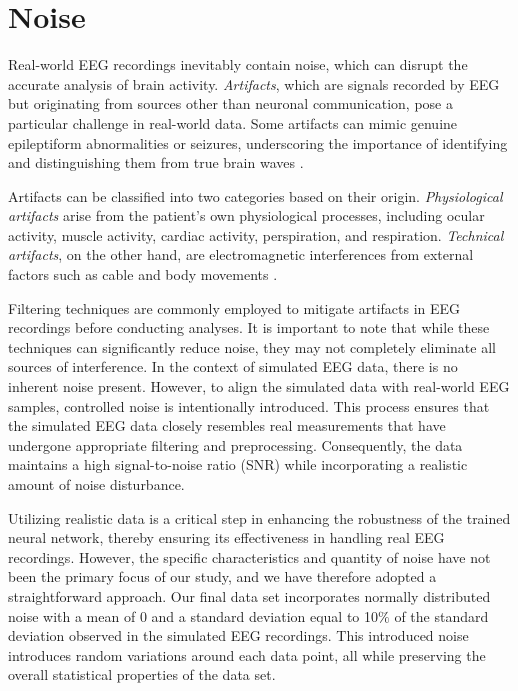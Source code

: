 \documentclass[a4paper, UKenglish, 11pt]{uiomaster}
\begin{document}
\section{Noise} \label{chap:noise}
Real-world EEG recordings inevitably contain noise, which can disrupt the accurate analysis of brain activity. \emph{Artifacts}, which are signals recorded by EEG but originating from sources other than neuronal communication, pose a particular challenge in real-world data. Some artifacts can mimic genuine epileptiform abnormalities or seizures, underscoring the importance of identifying and distinguishing them from true brain waves \cite{sazgar2019eeg}.

Artifacts can be classified into two categories based on their origin. \emph{Physiological artifacts} arise from the patient's own physiological processes, including ocular activity, muscle activity, cardiac activity, perspiration, and respiration. \emph{Technical artifacts}, on the other hand, are electromagnetic interferences from external factors such as cable and body movements \cite{bitbrain}.

Filtering techniques are commonly employed to mitigate artifacts in EEG recordings before conducting analyses. It is important to note that while these techniques can significantly reduce noise, they may not completely eliminate all sources of interference. In the context of simulated EEG data, there is no inherent noise present. However, to align the simulated data with real-world EEG samples, controlled noise is intentionally introduced. This process ensures that the simulated EEG data closely resembles real measurements that have undergone appropriate filtering and preprocessing. Consequently, the data maintains a high signal-to-noise ratio (SNR) while incorporating a realistic amount of noise disturbance.

Utilizing realistic data is a critical step in enhancing the robustness of the trained neural network, thereby ensuring its effectiveness in handling real EEG recordings. However, the specific characteristics and quantity of noise have not been the primary focus of our study, and we have therefore adopted a straightforward approach. Our final data set incorporates normally distributed noise with a mean of 0 and a standard deviation equal to 10$\%$ of the standard deviation observed in the simulated EEG recordings. This introduced noise introduces random variations around each data point, all while preserving the overall statistical properties of the data set.
\end{document}
